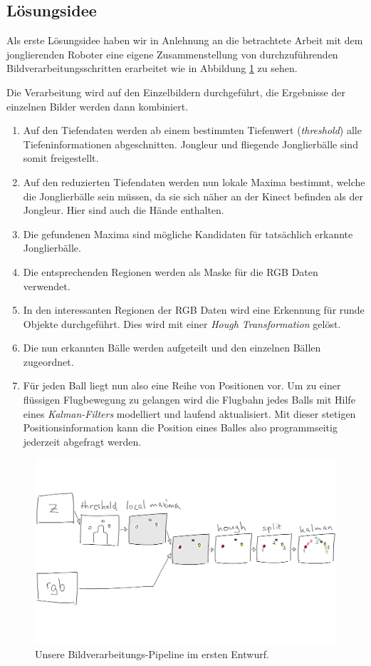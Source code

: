 \documentclass[12pt,a4paper,ngerman]{scrartcl}
\begin{document}
\subsection{Lösungsidee}

Als erste Lösungsidee haben wir in Anlehnung an die betrachtete Arbeit mit dem
jonglierenden Roboter eine eigene Zusammenstellung von durchzuführenden Bildverarbeitungsschritten
erarbeitet wie in Abbildung \ref{ourpipeline} zu sehen.

Die Verarbeitung wird auf den Einzelbildern durchgeführt, die Ergebnisse der
einzelnen Bilder werden dann kombiniert.

\begin{enumerate}
\item Auf den Tiefendaten werden ab einem bestimmten Tiefenwert (\textit{threshold})
	alle Tiefeninformationen abgeschnitten. Jongleur und fliegende Jonglierbälle sind
	somit freigestellt.
\item Auf den reduzierten Tiefendaten werden nun lokale Maxima bestimmt, welche die
	Jonglierbälle sein müssen, da sie sich näher an der Kinect befinden als der
	Jongleur. Hier sind auch die Hände enthalten.
\item Die gefundenen Maxima sind mögliche Kandidaten für tatsächlich erkannte
	Jonglierbälle.
\item Die entsprechenden Regionen werden als Maske für die RGB Daten verwendet.
\item In den interessanten Regionen der RGB Daten wird eine Erkennung für runde
	Objekte durchgeführt. Dies wird mit einer \textit{Hough Transformation} gelöst.
\item Die nun erkannten Bälle werden aufgeteilt und den einzelnen Bällen zugeordnet.
\item Für jeden Ball liegt nun also eine Reihe von Positionen vor. Um zu einer
	flüssigen Flugbewegung zu gelangen wird die Flugbahn jedes Balls mit Hilfe eines
	\textit{Kalman-Filters} modelliert und laufend aktualisiert. Mit dieser stetigen
	Positionsinformation kann die Position eines Balles also programmseitig jederzeit
	abgefragt werden.
\end{enumerate}

\begin{figure}[H]
    \centering
    \includegraphics[scale=0.14]{img/processing-pipeline.png}
    \caption{Unsere Bildverarbeitungs-Pipeline im ersten Entwurf.}
    \label{ourpipeline}
\end{figure}
\end{document}
